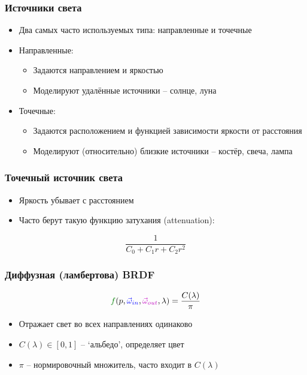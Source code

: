 \documentclass{beamer}
\begin{document}
\begin{frame}[fragile]
\frametitle{Источники света}
\begin{itemize}
\item Два самых часто используемых типа: направленные и точечные
\pause
\item Направленные:
\begin{itemize}
\item Задаются направлением и яркостью
\item Моделируют удалённые источники -- солнце, луна
\end{itemize}
\pause
\item Точечные:
\begin{itemize}
\item Задаются расположением и функцией зависимости яркости от расстояния
\item Моделируют (относительно) близкие источники -- костёр, свеча, лампа
\end{itemize}
\end{itemize}
\end{frame}

\begin{frame}[fragile]
\frametitle{Точечный источник света}
\begin{itemize}
\item Яркость убывает с расстоянием
\item Часто берут такую функцию затухания (attenuation):
\end{itemize}
\begin{equation*}
\frac{1}{C_0 + C_1 r + C_2 r^2}
\end{equation*}
\end{frame}

\begin{frame}[fragile]
\frametitle{Диффузная (ламбертова) BRDF}
\begin{equation*}
{\color{green}f}(p, {\color{blue}\vec\omega_{in}}, {\color{magenta}\vec\omega_{out}}, \lambda) = \frac{C(\lambda)}{\pi}
\end{equation*}
\begin{itemize}
\item Отражает свет во всех направлениях одинаково
\item \begin{math}C(\lambda) \in [0, 1]\end{math} -- `альбедо', определяет цвет
\item \begin{math}\pi\end{math} -- нормировочный множитель, часто входит в \begin{math}C(\lambda)\end{math}
\end{itemize}
\end{frame}
\end{document}
